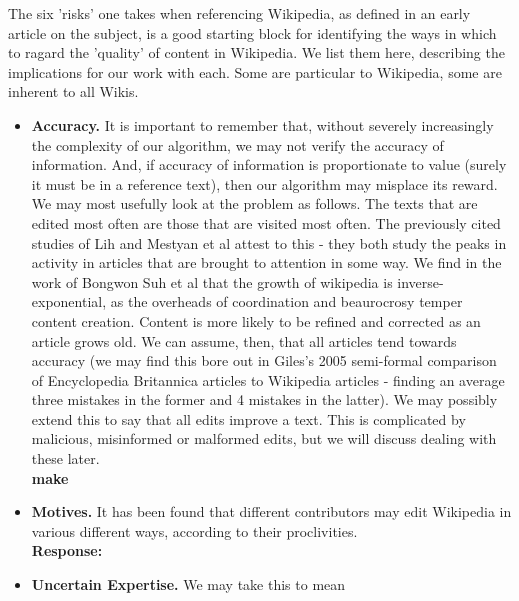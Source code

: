 \documentclass[a4paper,11pt,twoside,notitlepage]{article}
\begin{document}
        The six 'risks' one takes when referencing Wikipedia, as
        defined in an early article on the subject,\cite{Denning2005}
        is a good starting block for identifying the ways in which to
        ragard the 'quality' of content in Wikipedia. We list them
        here, describing the implications for our work with each. Some
        are particular to Wikipedia, some are inherent to all Wikis.
        
        \begin{itemize}
          \item \textbf{Accuracy.} It is important to remember that,
            without severely increasingly the complexity of our
            algorithm, we may not verify the accuracy of
            information. And, if accuracy of information is
            proportionate to value (surely it must be in a reference
            text), then our algorithm may misplace its reward. We may
            most usefully look at the problem as follows. The texts that
            are edited most often are those that are visited most
            often. The previously cited studies of Lih and Mestyan et al
            attest to this - they both study the peaks in activity in
            articles that are brought to attention in some way. We
            find in the work of Bongwon Suh et al that the growth of
            wikipedia is inverse-exponential, as the overheads of
            coordination and beaurocrosy temper content
            creation.\cite{Suh2009}\cite{Kittur2007} Content is more
            likely to be refined and corrected as an article grows
            old.\cite{Wilkinson2007} We can assume, then, that all
            articles tend towards accuracy (we may find this bore out
            in Giles's 2005 semi-formal comparison of Encyclopedia
            Britannica articles to Wikipedia articles - finding an
            average three mistakes in the former and 4 mistakes in the
            latter)\cite{Giles2005}. We may possibly extend this to
            say that all edits improve a text. This is complicated by
            malicious, misinformed or malformed edits, but we will
            discuss dealing with these later.\\
            \textbf{make}
          \item \textbf{Motives.} It has been found that different
            contributors may edit Wikipedia in various different ways,
            according to their proclivities.\\
            \textbf{Response:}
          \item \textbf{Uncertain Expertise.} We may take this to mean

\end{itemize}
\end{document}
